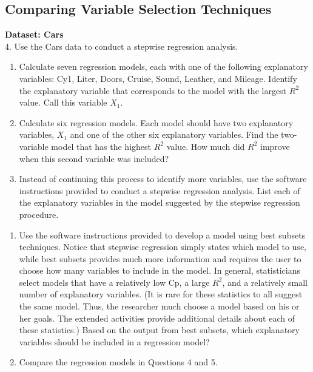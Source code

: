 \documentclass[
]{report}
\begin{document}
\subsection*{Comparing Variable Selection Techniques}\label{comparing-variable-selection-techniques}

\textbf{Dataset: Cars}\\
4. Use the Cars data to conduct a stepwise regression analysis.

\begin{enumerate}
\def\labelenumi{\alph{enumi}.}
\item
  Calculate seven regression models, each with one of the following explanatory variables: Cy1, Liter, Doors, Cruise, Sound, Leather, and Mileage. Identify the explanatory variable that corresponds to the model with the largest \(R^2\) value. Call this variable \(X_1\).
\item
  Calculate six regression models. Each model should have two explanatory variables, \(X_1\) and one of the other six explanatory variables. Find the two-variable model that has the highest \(R^2\) value. How much did \(R^2\) improve when this second variable was included?
\item
  Instead of continuing this process to identify more variables, use the software instructions provided to conduct a stepwise regression analysis. List each of the explanatory variables in the model suggested by the stepwise regression procedure.
\end{enumerate}

\begin{enumerate}
\def\labelenumi{\arabic{enumi}.}
\setcounter{enumi}{4}
\item
  Use the software instructions provided to develop a model using best subsets techniques. Notice that stepwise regression simply states which model to use, while best subsets provides much more information and requires the user to choose how many variables to include in the model. In general, statisticians select models that have a relatively low Cp, a large \(R^2\), and a relatively small number of explanatory variables. (It is rare for these statistics to all suggest the same model. Thus, the researcher much choose a model based on his or her goals. The extended activities provide additional details
  about each of these statistics.) Based on the output from best subsets, which explanatory variables should be included in a regression model?
\item
  Compare the regression models in Questions 4 and 5.
\end{enumerate}
\end{document}

